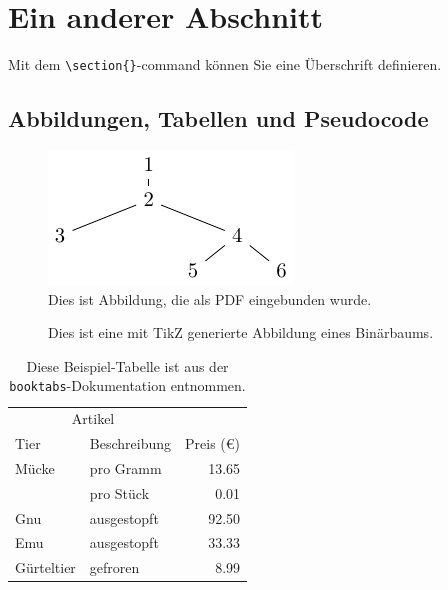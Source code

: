 \documentclass[a4paper,ngerman]{tui-algo-seminar}
\begin{document}
\section{Ein anderer Abschnitt}

Mit dem \texttt{\textbackslash section\{\}}-command können Sie eine Überschrift definieren.

\subsection{Abbildungen, Tabellen und Pseudocode}

\begin{figure}[ht]
	\centering
	\includegraphics[scale = 0.7]{figures/figure-1.pdf}
	\caption{Dies ist Abbildung, die als PDF eingebunden wurde.}
	\label{fig:picture}
\end{figure}

\begin{figure}
	\centering
	\caption{Dies ist eine mit TikZ generierte Abbildung eines Binärbaums.}
	\label{fig:binary-tree}
\end{figure}

\begin{table}[ht]
\centering
\caption{Diese Beispiel-Tabelle ist aus der \texttt{booktabs}-Dokumentation entnommen.}
\begin{tabular}{llr}
	\toprule
	\multicolumn{2}{c}{Artikel} \\
	\cmidrule(r){1-2}
	Tier & Beschreibung & Preis (€) \\
	\midrule
	Mücke & pro Gramm & 13.65 \\
				& pro Stück & 0.01 \\
	Gnu   & ausgestopft & 92.50 \\
	Emu   & ausgestopft & 33.33 \\
	Gürteltier & gefroren & 8.99 \\
	\bottomrule
\end{tabular}
\label{tab:interessante-tabelle}
\end{table}
\end{document}

